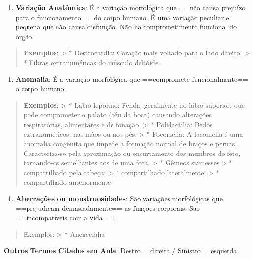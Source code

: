 \documentclass[
]{book}
\providecommand{\tightlist}{%
  \setlength{\itemsep}{0pt}\setlength{\parskip}{0pt}}
\begin{document}
\begin{enumerate}
\def\labelenumi{\arabic{enumi}.}
\tightlist
\item
  \textbf{Variação Anatômica}: É a variação morfológica que ==não causa prejuízo para o funcionamento== do corpo humano. É uma variação peculiar e pequena que não causa disfunção. Não há comprometimento funcional do órgão.
\end{enumerate}

\begin{quote}
\textbf{Exemplos}:
\textgreater{} * Destrocardia: Coração mais voltado para o lado direito.
\textgreater{} * Fibras extranuméricas do músculo deltóide.
\end{quote}

\begin{enumerate}
\def\labelenumi{\arabic{enumi}.}
\setcounter{enumi}{1}
\tightlist
\item
  \textbf{Anomalia}: É a variação morfológica que ==compromete funcionalmente== o corpo humano.
\end{enumerate}

\begin{quote}
\textbf{Exemplos}:
\textgreater{} * Lábio leporino: Fenda, geralmente no lábio superior, que pode comprometer o palato (céu da boca) causando alterações respiratórias, alimentares e de fonação.
\textgreater{} * Polidactilia: Dedos extranuméricos, nas mãos ou nos pés.
\textgreater{} * Focomelia: A focomelia é uma anomalia congênita que impede a formação normal de braços e pernas. Caracteriza-se pela aproximação ou encurtamento dos membros do feto, tornando-os semelhantes aos de uma foca.
\textgreater{} * Gêmeos siamesses
\textgreater{} * compartilhado pela cabeça;
\textgreater{} * compartilhado lateralmente;
\textgreater{} * compartilhado anteriormente
\end{quote}

\begin{enumerate}
\def\labelenumi{\arabic{enumi}.}
\setcounter{enumi}{2}
\tightlist
\item
  \textbf{Aberrações ou monstruosidades}: São variações morfológicas que ==prejudicam demasiadamente== as funções corporais. São ==incompatíveis com a vida==.
\end{enumerate}

\begin{quote}
Exemplos:
\textgreater{} * Anencéfalia
\end{quote}

\textbf{Outros Termos Citados em Aula}: Destro = direita / Sinistro = esquerda
\end{document}
